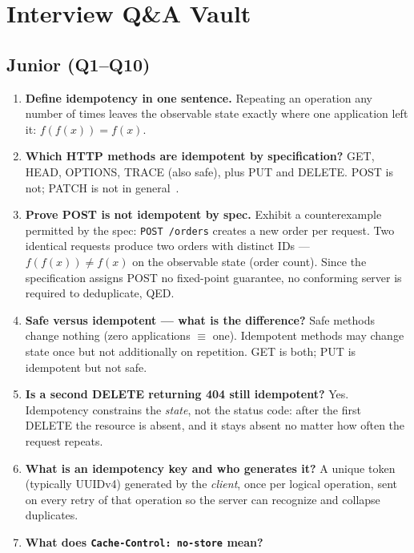 \section{Interview Q\&A Vault}
\label{sec:ch10-interview}

\subsection*{Junior (Q1--Q10)}
\begin{enumerate}[label=\textbf{Q\arabic*.}, leftmargin=1.6cm]
  \item \textbf{Define idempotency in one sentence.}
        Repeating an operation any number of times leaves the observable
        state exactly where one application left it: $f(f(x)) = f(x)$.
  \item \textbf{Which HTTP methods are idempotent by specification?}
        GET, HEAD, OPTIONS, TRACE (also safe), plus PUT and DELETE. POST is
        not; PATCH is not in general~\cite{rfc9110}.
  \item \textbf{Prove POST is not idempotent by spec.}
        Exhibit a counterexample permitted by the spec:
        \texttt{POST /orders} creates a new order per request. Two
        identical requests produce two orders with distinct IDs ---
        $f(f(x)) \neq f(x)$ on the observable state (order count). Since
        the specification assigns POST no fixed-point guarantee, no
        conforming server is required to deduplicate, QED.
  \item \textbf{Safe versus idempotent --- what is the difference?}
        Safe methods change nothing (zero applications $\equiv$ one).
        Idempotent methods may change state once but not additionally on
        repetition. GET is both; PUT is idempotent but not safe.
  \item \textbf{Is a second DELETE returning 404 still idempotent?}
        Yes. Idempotency constrains the \emph{state}, not the status code:
        after the first DELETE the resource is absent, and it stays absent
        no matter how often the request repeats.
  \item \textbf{What is an idempotency key and who generates it?}
        A unique token (typically UUIDv4) generated by the \emph{client},
        once per logical operation, sent on every retry of that operation
        so the server can recognize and collapse duplicates.
  \item \textbf{What does \texttt{Cache-Control: no-store} mean?}

\end{enumerate}
